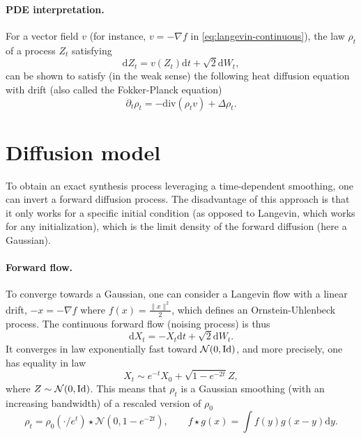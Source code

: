 \paragraph{PDE interpretation.} For a vector field $v$ (for instance, $v=-\nabla f$ in \eqref{eq:langevin-continuous}), the law $\rho_t$ of a process $Z_t$ satisfying 
\begin{equation*}
	\mathrm{d} Z_t = v(Z_t) \mathrm{d} t + \sqrt{2} \mathrm{d} W_t,
\end{equation*}
can be shown to satisfy (in the weak sense) the following heat diffusion equation with drift (also called the Fokker-Planck equation)
\begin{equation}\label{eq:Fokker-Planck}
	\partial_t \rho_t = -\text{div}(\rho_t v) + \Delta \rho_t. 
\end{equation}


\section{Diffusion model}

To obtain an exact synthesis process leveraging a time-dependent smoothing, one can invert a forward diffusion process. The disadvantage of this approach is that it only works for a specific initial condition (as opposed to Langevin, which works for any initialization), which is the limit density of the forward diffusion (here a Gaussian).

\paragraph{Forward flow.}
To converge towards a Gaussian, one can consider a Langevin flow with a linear drift, $-x = -\nabla f$ where $f(x)=\frac{\|x\|^2}{2}$, which defines an Ornstein-Uhlenbeck process. 
%
The continuous forward flow (noising process) is thus
\begin{equation*}
	\mathrm{d} X_t = - X_t \mathrm{d} t + \sqrt{2} \mathrm{d} W_t.
\end{equation*}
It converges in law exponentially fast toward $\mathcal{N}(0,\mathrm{Id})$, and more precisely, one has equality in law 
\begin{equation}\label{eq:law-or-uhl}
	X_t \sim  e^{-t} X_0 + \sqrt{1-e^{-2t}} Z,
\end{equation}
where $Z \sim \mathcal{N}(0,\mathrm{Id})$. This means that $\rho_t$ is a Gaussian smoothing (with an increasing bandwidth) of a rescaled version of $\rho_0$
\begin{equation*}
	\rho_t = \rho_0(\cdot/e^t) \star \mathcal{N}(0, 1-e^{-2t}),
	\qquad
	f \star g(x) = \int f(y) g(x-y) \mathrm{d} y. 
\end{equation*}

